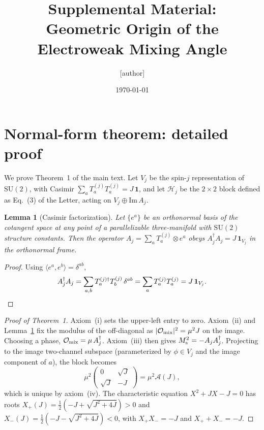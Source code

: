 \documentclass[aps,prd,onecolumn,superscriptaddress,nofootinbib,reprint]{revtex4-2}
\newtheorem{lemma}{Lemma}
\newcommand{\Xp}{X_{+}}
\newcommand{\Xm}{X_{-}}
\newcommand{\cA}{\mathcal{A}}
\newcommand{\cH}{\mathcal{H}}
\newcommand{\SU}{\mathrm{SU}}
\begin{document}
\title{Supplemental Material:\\
Geometric Origin of the Electroweak Mixing Angle}

\author{[author]}
\affiliation{[affiliation]}

\date{\today}

\maketitle

\tableofcontents

\section{Normal-form theorem: detailed proof}
\label{app:nf}

We prove Theorem~1 of the main text.  Let $V_{j}$ be the spin-$j$
representation of $\SU(2)$, with Casimir
$\sum_{a}T_{a}^{(j)}T_{a}^{(j)}=J\,\mathbf{1}$, and let $\cH_{j}$ be the
$2\times 2$ block defined as Eq.~(3) of the Letter, acting on
$V_{j}\oplus\mathrm{Im}\,A_{j}$.

\begin{lemma}[Casimir factorization]
\label{lem:cas}
Let $\{e^{a}\}$ be an orthonormal basis of the cotangent space at any
point of a parallelizable three-manifold with $\SU(2)$ structure
constants.  Then the operator
$A_{j}=\sum_{a}T_{a}^{(j)}\otimes e^{a}$ obeys
$A_{j}^{\dagger}A_{j}=J\,\mathbf{1}_{V_{j}}$ in the orthonormal frame.
\end{lemma}

\begin{proof}
Using $\langle e^{a},e^{b}\rangle=\delta^{ab}$,
\begin{equation*}
  A_{j}^{\dagger}A_{j}
  =\sum_{a,b}T_{a}^{(j)\dagger}T_{b}^{(j)}\,\delta^{ab}
  =\sum_{a}T_{a}^{(j)}T_{a}^{(j)}
  =J\,\mathbf{1}_{V_{j}}.\qedhere
\end{equation*}
\end{proof}

\begin{proof}[Proof of Theorem~1]
Axiom~(i) sets the upper-left entry to zero.  Axiom~(ii) and
Lemma~\ref{lem:cas} fix the modulus of the off-diagonal as
$|\mathcal{O}_{\rm mix}|^{2}=\mu^{2}J$ on the image.  Choosing a phase,
$\mathcal{O}_{\rm mix}=\mu\,A_{j}^{\dagger}$.  Axiom~(iii) then gives
$M_{\rm s}^{2}=-A_{j}A_{j}^{\dagger}$.  Projecting to the image
two-channel subspace (parameterized by $\phi\in V_{j}$ and the image
component of $a$), the block becomes
\begin{equation}
  \mu^{2}
  \begin{pmatrix} 0 & \sqrt{J}\\ \sqrt{J} & -J\end{pmatrix}
  =\mu^{2}\cA(J),
\end{equation}
which is unique by axiom~(iv).  The characteristic equation $X^{2}+JX-J=0$ has
roots
$\Xp(J)=\tfrac12(-J+\sqrt{J^{2}+4J})>0$ and
$\Xm(J)=\tfrac12(-J-\sqrt{J^{2}+4J})<0$, with
$\Xp\Xm=-J$ and $\Xp+\Xm=-J$.
\end{proof}
\end{document}

